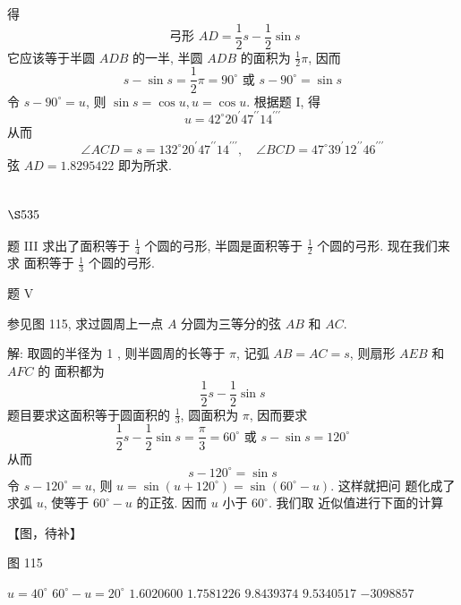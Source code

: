 得
\[
\text { 弓形 } A D=\frac{1}{2} s-\frac{1}{2} \sin s
\]
它应该等于半圆 $A D B$ 的一半, 半圆 $A D B$ 的面积为 $\frac{1}{2} \pi$, 因而
\[
s-\sin s=\frac{1}{2} \pi=90^{\circ} \text { 或 } s-90^{\circ}=\sin s
\]
令 $s-90^{\circ}=u$, 则 $\sin s=\cos u, u=\cos u$. 根据题 $\mathrm{I}$, 得
\[
u=42^{\circ} 20^{\prime} 47^{\prime \prime} 14^{\prime \prime \prime}
\]
从而
\[
\angle A C D=s=132^{\circ} 20^{\prime} 47^{\prime \prime} 14^{\prime \prime \prime}, \quad \angle B C D=47^{\circ} 39^{\prime} 12^{\prime \prime} 46^{\prime \prime \prime}
\]
弦 $A D=1.8295422$ 即为所求.

\section{$\S 535$}

题 III 求出了面积等于 $\frac{1}{4}$ 个圆的弓形, 半圆是面积等于 $\frac{1}{2}$ 个圆的弓形. 现在我们来求 面积等于 $\frac{1}{3}$ 个圆的弓形.

题 V

参见图 115, 求过圆周上一点 $A$ 分圆为三等分的弦 $A B$ 和 $A C$.

解: 取圆的半径为 1 , 则半圆周的长等于 $\pi$, 记弧 $A B=A C=s$, 则扇形 $A E B$ 和 $A F C$ 的 面积都为
\[
\frac{1}{2} s-\frac{1}{2} \sin s
\]
题目要求这面积等于圆面积的 $\frac{1}{3}$, 圆面积为 $\pi$, 因而要求
\[
\frac{1}{2} s-\frac{1}{2} \sin s=\frac{\pi}{3}=60^{\circ} \text { 或 } s-\sin s=120^{\circ}
\]
从而
\[
s-120^{\circ}=\sin s
\]
令 $s-120^{\circ}=u$, 则 $u=\sin \left(u+120^{\circ}\right)=\sin \left(60^{\circ}-u\right)$. 这样就把问 题化成了求弧 $u$, 使等于 $60^{\circ}-u$ 的正弦. 因而 $u$ 小于 $60^{\circ}$. 我们取 近似值进行下面的计算


【图，待补】

图 115

$u=40^{\circ}$
$60^{\circ}-u=20^{\circ}$
$1.6020600$
$1.7581226$
$9.8439374$
$9.5340517$
$-3098857$

